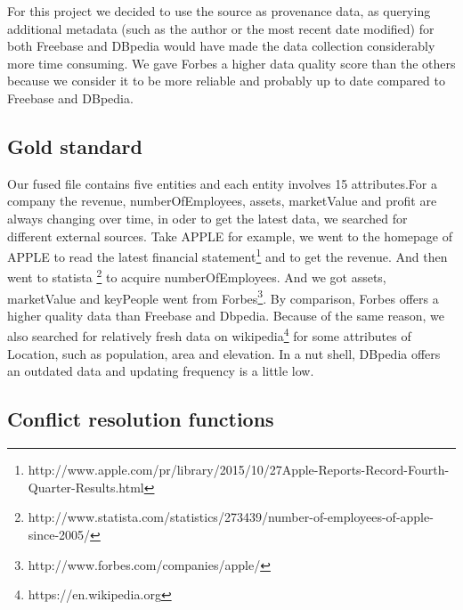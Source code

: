 

For this project we decided to use the source as provenance data, as querying additional metadata (such as the author or the most recent date modified) for both Freebase and DBpedia would have made the data collection considerably more time consuming. We gave Forbes a higher data quality score than the others because we consider it to be more reliable and probably up to date compared to Freebase and DBpedia.




\subsection{Gold standard}
Our fused file contains five entities and each entity involves 15 attributes.For a company the revenue, numberOfEmployees, assets, marketValue and profit are always changing over time, in oder to get the latest data, we searched for different external sources. Take APPLE for example, we went to the homepage of APPLE  to read the latest financial statement\footnote{http://www.apple.com/pr/library/2015/10/27Apple-Reports-Record-Fourth-Quarter-Results.html} and to get the revenue. And then went to statista \footnote{http://www.statista.com/statistics/273439/number-of-employees-of-apple-since-2005/} to acquire numberOfEmployees. And we got assets, marketValue and keyPeople went from Forbes\footnote{http://www.forbes.com/companies/apple/}. By comparison, Forbes offers a higher quality data than Freebase and Dbpedia. Because of the same reason, we also searched for relatively fresh data on wikipedia\footnote{https://en.wikipedia.org} for some attributes of Location, such as population, area and elevation. In a nut shell, DBpedia offers an outdated data and updating frequency is a little low.
 

\subsection{Conflict resolution functions}

